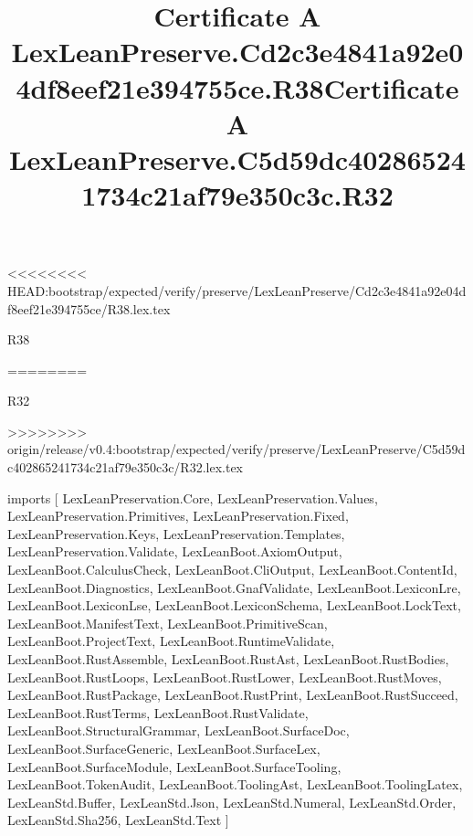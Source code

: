 <<<<<<<< HEAD:bootstrap/expected/verify/preserve/LexLeanPreserve/Cd2c3e4841a92e04df8eef21e394755ce/R38.lex.tex
\begin{lexlean}{R38}
\title{Certificate A LexLeanPreserve.Cd2c3e4841a92e04df8eef21e394755ce.R38}
========
\begin{lexlean}{R32}
\title{Certificate A LexLeanPreserve.C5d59dc402865241734c21af79e350c3c.R32}
>>>>>>>> origin/release/v0.4:bootstrap/expected/verify/preserve/LexLeanPreserve/C5d59dc402865241734c21af79e350c3c/R32.lex.tex
\begin{coremodule}
imports [
  LexLeanPreservation.Core,
  LexLeanPreservation.Values,
  LexLeanPreservation.Primitives,
  LexLeanPreservation.Fixed,
  LexLeanPreservation.Keys,
  LexLeanPreservation.Templates,
  LexLeanPreservation.Validate,
  LexLeanBoot.AxiomOutput,
  LexLeanBoot.CalculusCheck,
  LexLeanBoot.CliOutput,
  LexLeanBoot.ContentId,
  LexLeanBoot.Diagnostics,
  LexLeanBoot.GnafValidate,
  LexLeanBoot.LexiconLre,
  LexLeanBoot.LexiconLse,
  LexLeanBoot.LexiconSchema,
  LexLeanBoot.LockText,
  LexLeanBoot.ManifestText,
  LexLeanBoot.PrimitiveScan,
  LexLeanBoot.ProjectText,
  LexLeanBoot.RuntimeValidate,
  LexLeanBoot.RustAssemble,
  LexLeanBoot.RustAst,
  LexLeanBoot.RustBodies,
  LexLeanBoot.RustLoops,
  LexLeanBoot.RustLower,
  LexLeanBoot.RustMoves,
  LexLeanBoot.RustPackage,
  LexLeanBoot.RustPrint,
  LexLeanBoot.RustSucceed,
  LexLeanBoot.RustTerms,
  LexLeanBoot.RustValidate,
  LexLeanBoot.StructuralGrammar,
  LexLeanBoot.SurfaceDoc,
  LexLeanBoot.SurfaceGeneric,
  LexLeanBoot.SurfaceLex,
  LexLeanBoot.SurfaceModule,
  LexLeanBoot.SurfaceTooling,
  LexLeanBoot.TokenAudit,
  LexLeanBoot.ToolingAst,
  LexLeanBoot.ToolingLatex,
  LexLeanStd.Buffer,
  LexLeanStd.Json,
  LexLeanStd.Numeral,
  LexLeanStd.Order,
  LexLeanStd.Sha256,
  LexLeanStd.Text
]


\end{coremodule}
\end{lexlean}
\end{lexlean}
